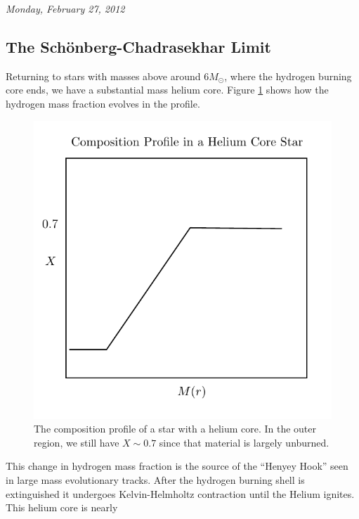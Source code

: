 \documentclass[10pt]{article}
\numberwithin{equation}{section}
\newcommand{\n}{\noindent}
\newcommand{\figref}[1]{Figure \ref{#1}}
\begin{document}
    \n \textit{Monday, February 27, 2012}

    \subsection{The Sch\"onberg-Chadrasekhar Limit}
    \label{sec:schonb-chadr-limit}

    Returning to stars with masses above around $6M_\odot$, where the
    hydrogen burning core ends, we have a substantial mass helium
    core. \figref{fig:3} shows how the hydrogen mass fraction evolves
    in the profile.\\

    \begin{figure}[h!]
      \centering
      \includegraphics{compPlot.pdf}
      \caption{The composition profile of a star with a helium
        core. In the outer region, we still have $X\sim 0.7$ since
        that material is largely unburned.}
      \label{fig:3}
    \end{figure}
    \n This change in hydrogen mass fraction is the source of the
    ``Henyey Hook'' seen in large mass evolutionary tracks. After the
    hydrogen burning shell is extinguished it undergoes Kelvin-Helmholtz
    contraction until the Helium ignites. This helium core is nearly
\end{document}
